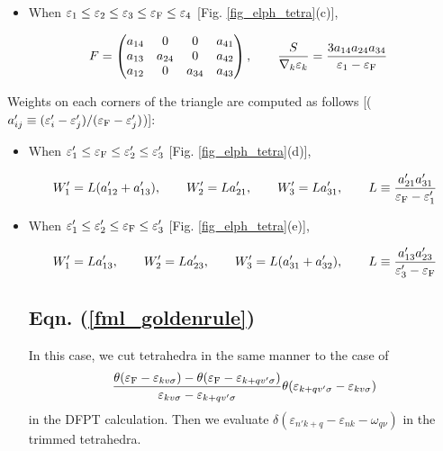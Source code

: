 \documentclass[12pt]{article}
\begin{document}
\begin{itemize}
\item When $\varepsilon_1 \leq \varepsilon_2 \leq \varepsilon_3 \leq \varepsilon_{\rm F} \leq \varepsilon_4$
  [Fig. \ref{fig_elph_tetra}(c)], 

  \begin{align}
    F &= 
    \begin{pmatrix}
      a_{1 4} &       0 &       0 & a_{4 1} \\
      a_{1 3} & a_{2 4} &       0 & a_{4 2} \\
      a_{1 2} &       0 & a_{3 4} & a_{4 3}
    \end{pmatrix}, 
    \qquad
    \frac{S}{\nabla_k \varepsilon_k} = \frac{3 a_{1 4} a_{2 4} a_{3 4}}{\varepsilon_1 - \varepsilon_{\rm F}}
  \end{align}

\end{itemize}

Weights on each corners of the triangle are computed as follows
[($a'_{i j} \equiv (\varepsilon'_i - \varepsilon'_j)/(\varepsilon_{\rm F} - \varepsilon'_j)$)]:

\begin{itemize}

\item When $\varepsilon'_1 \leq \varepsilon_{\rm F} \leq \varepsilon'_2 \leq \varepsilon'_3$
  [Fig. \ref{fig_elph_tetra}(d)], 

  \begin{align}
    W'_1 = L (a'_{1 2} + a'_{1 3}), \qquad
    W'_2 = L a'_{2 1}, \qquad
    W'_3 = L a'_{3 1}, \qquad
    L \equiv \frac{a'_{2 1} a'_{3 1}}{\varepsilon_{\rm F} - \varepsilon'_{1}}
  \end{align}

\item When $\varepsilon'_1 \leq \varepsilon'_2 \leq \varepsilon_{\rm F} \leq \varepsilon'_3$
  [Fig. \ref{fig_elph_tetra}(e)], 

  \begin{align}
    W'_1 = L a'_{1 3}, \qquad
    W'_2 = L a'_{2 3}, \qquad
    W'_3 = L (a'_{3 1} + a'_{3 2}), \qquad
    L \equiv \frac{a'_{1 3} a'_{2 3}}{\varepsilon'_{3} - \varepsilon_{\rm F}} 
  \end{align}

\subsection{Eqn. (\ref{fml_goldenrule})}

In this case, we cut tetrahedra in the same manner to the case of 
\begin{align}
    \frac{\theta(\varepsilon_{\rm F} - \varepsilon_{k v \sigma})
      - \theta(\varepsilon_{\rm F} - \varepsilon_{k+q v' \sigma})}
         {\varepsilon_{k v \sigma} - \varepsilon_{k+q v' \sigma}}
         \theta(\varepsilon_{k+q v' \sigma} - \varepsilon_{k v \sigma})
\end{align}
in the DFPT calculation.
Then we evaluate $\delta(\varepsilon_{n' k+q} - \varepsilon_{n k} - \omega_{q \nu})$
in the trimmed tetrahedra.

\end{itemize}
\end{document}
